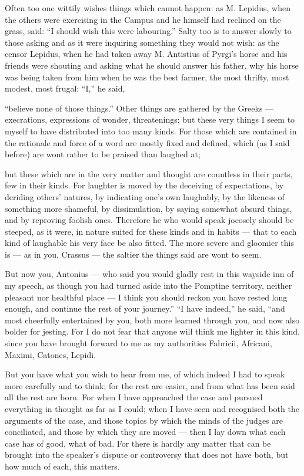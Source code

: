  Often too one wittily wishes things which cannot happen: as M. Lepidus, when the others were exercising in the Campus and he himself had reclined on the grass, said: ``I should wish this were labouring.'' Salty too is to answer slowly to those asking and as it were inquiring something they would not wish: as the censor Lepidus, when he had taken away M. Antistius of Pyrgi's horse and his friends were shouting and asking what he should answer his father, why his horse was being taken from him when he was the best farmer, the most thrifty, most modest, most frugal: ``I,'' he said,

 ``believe none of those things.'' Other things are gathered by the Greeks — execrations, expressions of wonder, threatenings; but these very things I seem to myself to have distributed into too many kinds. For those which are contained in the rationale and force of a word are mostly fixed and defined, which (as I said before) are wont rather to be praised than laughed at;

 but these which are in the very matter and thought are countless in their parts, few in their kinds. For laughter is moved by the deceiving of expectations, by deriding others' natures, by indicating one's own laughably, by the likeness of something more shameful, by dissimulation, by saying somewhat absurd things, and by reproving foolish ones. Therefore he who would speak jocosely should be steeped, as it were, in nature suited for these kinds and in habits — that to each kind of laughable his very face be also fitted. The more severe and gloomier this is — as in you, Crassus — the saltier the things said are wont to seem.

 But now you, Antonius — who said you would gladly rest in this wayside inn of my speech, as though you had turned aside into the Pomptine territory, neither pleasant nor healthful place — I think you should reckon you have rested long enough, and continue the rest of your journey.'' ``I have indeed,'' he said, ``and most cheerfully entertained by you, both more learned through you, and now also bolder for jesting. For I do not fear that anyone will think me lighter in this kind, since you have brought forward to me as my authorities Fabricii, Africani, Maximi, Catones, Lepidi.

 But you have what you wish to hear from me, of which indeed I had to speak more carefully and to think; for the rest are easier, and from what has been said all the rest are born. For when I have approached the case and pursued everything in thought as far as I could; when I have seen and recognised both the arguments of the case, and those topics by which the minds of the judges are conciliated, and those by which they are moved — then I lay down what each case has of good, what of bad. For there is hardly any matter that can be brought into the speaker's dispute or controversy that does not have both, but how much of each, this matters.


